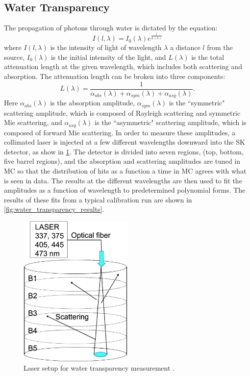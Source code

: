 \subsection{Water Transparency}
The propagation of photons through water is dictated by the equation:
\begin{equation}
I(l,\lambda)=I_0(\lambda)e^{\frac{l}{L(\lambda)}}
\label{eq:light_intensity}
\end{equation} 
 where $I(l,\lambda)$ is the intensity of light of wavelength $\lambda$ a distance $l$ from the source, $I_0(\lambda)$ is the initial intensity of the light, and $L(\lambda)$ is the total attenuation length at the given wavelength, which includes both scattering and absorption.  The attenuation length can be broken into three components:
\begin{equation}
L(\lambda)=\frac{1}{\alpha_{abs}(\lambda)+\alpha_{sym}(\lambda)+\alpha_{asy}(\lambda)}.
\end{equation}
Here $\alpha_{abs}(\lambda)$ is the absorption amplitude, $\alpha_{sym}(\lambda)$ is the ``symmetric" scattering amplitude, which is composed of Rayleigh scattering and symmetric Mie scattering, and $\alpha_{asy}(\lambda)$ is the ``asymmetric" scattering amplitude, which is composed of forward Mie scattering.  In order to measure these amplitudes, a collimated laser is injected at a few different wavelengths downward into the SK detector, as show in \cref{fig:laser}.  The detector is divided into seven regions, (top, bottom, five barrel regions), and the absorption and scattering amplitudes are tuned in MC so that the distribution of hits as a function a time in MC agrees with what is seen in data.  The results at the different wavelengths are then used to fit the amplitudes as a function of wavelength to  predetermined polynomial forms.  The results of these fits from a typical calibration run are shown in \cref{fig:water_transparency_results}.

\begin{figure}
\centering
\includegraphics[width=0.5\textwidth]{figures/Laser.jpg}
\caption{Laser setup for water transparency measurement \cite{Abe:2013gga}.}
\label{fig:laser}
\end{figure}

